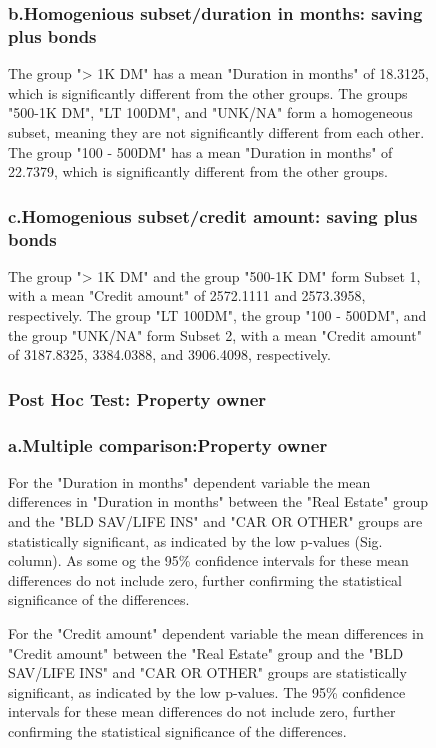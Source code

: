 \documentclass[english,10pt,a4paper]{article}
\begin{document}
\begin{figure}[h]	
		\subsubsection*{b.Homogenious subset/duration in months: saving plus bonds}
		The group "> 1K DM" has a mean "Duration in months" of 18.3125, which is significantly different from the other groups.
		The groups "500-1K DM", "LT 100DM", and "UNK/NA" form a homogeneous subset, meaning they are not significantly different from each other.
		The group "100 - 500DM" has a mean "Duration in months" of 22.7379, which is significantly different from the other groups.
		
		
			\subsubsection*{c.Homogenious subset/credit amount:  saving plus bonds}
		
		The group "> 1K DM" and the group "500-1K DM" form Subset 1, with a mean "Credit amount" of 2572.1111 and 2573.3958, respectively.
		The group "LT 100DM", the group "100 - 500DM", and the group "UNK/NA" form Subset 2, with a mean "Credit amount" of 3187.8325, 3384.0388, and 3906.4098, respectively.
		
	\subsubsection*{Post Hoc Test:  Property owner}	
	\subsubsection*{a.Multiple comparison:Property owner}
For the "Duration in months" dependent variable the mean differences in "Duration in months" between the "Real Estate" group and the "BLD SAV/LIFE INS" and "CAR OR OTHER" groups are statistically significant, as indicated by the low p-values (Sig. column). As some og the 95\% confidence intervals for these mean differences do not include zero, further confirming the statistical significance of the differences.

For the "Credit amount" dependent variable the mean differences in "Credit amount" between the "Real Estate" group and the "BLD SAV/LIFE INS" and "CAR OR OTHER" groups are statistically significant, as indicated by the low p-values.
The 95\% confidence intervals for these mean differences do not include zero, further confirming the statistical significance of the differences.


\end{figure}
\end{document}
